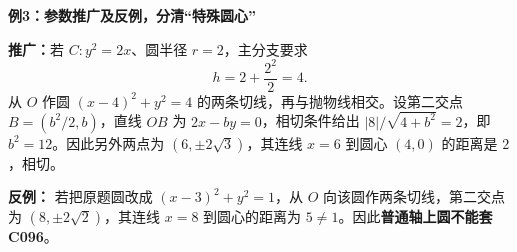 \clearpage
\begin{examplebox}
\textbf{例3：参数推广及反例，分清“特殊圆心”}

\textbf{推广：}若 $C:y^2=2x$、圆半径 $r=2$，主分支要求
\[
h=2+\frac{2^2}{2}=4.
\]
从 $O$ 作圆 $(x-4)^2+y^2=4$ 的两条切线，再与抛物线相交。设第二交点 $B=(b^2/2,b)$，直线 $OB$ 为 $2x-by=0$，相切条件给出 $|8|/\sqrt{4+b^2}=2$，即 $b^2=12$。因此另外两点为 $(6,\pm2\sqrt3)$，其连线 $x=6$ 到圆心 $(4,0)$ 的距离是 $2$，相切。

\medskip
\textbf{反例：} 若把原题圆改成 $(x-3)^2+y^2=1$，从 $O$ 向该圆作两条切线，第二交点为 $(8,\pm2\sqrt2)$，其连线 $x=8$ 到圆心的距离为 $5\ne1$。因此\textbf{普通轴上圆不能套 C096}。
\begin{center}

\end{center}
\end{examplebox}
